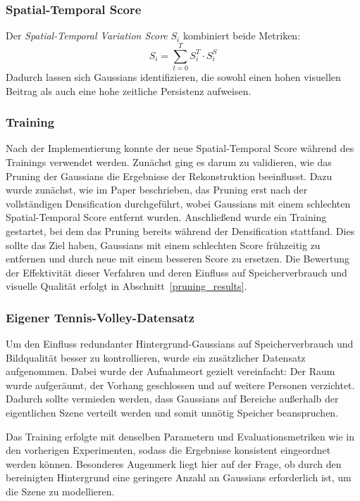 \subsubsection{Spatial-Temporal Score}  

Der \emph{Spatial-Temporal Variation Score} $S_i$ kombiniert beide Metriken:
\[
S_i = \sum_{t=0}^{T} S_i^T \cdot S_i^S
\]
Dadurch lassen sich Gaussians identifizieren, die sowohl einen hohen visuellen Beitrag als auch eine hohe zeitliche Persistenz aufweisen.

\subsubsection{Training}
Nach der Implementierung konnte der neue Spatial-Temporal Score während des Trainings verwendet werden. 
Zunächst ging es darum zu validieren, wie das Pruning der Gaussians die Ergebnisse der Rekonstruktion beeinflusst.
Dazu wurde zunächst, wie im Paper beschrieben, das Pruning erst nach der vollständigen Densification durchgeführt, wobei Gaussians mit einem schlechten Spatial-Temporal Score entfernt wurden.
Anschließend wurde ein Training gestartet, bei dem das Pruning bereits während der Densification stattfand.
Dies sollte das Ziel haben, Gaussians mit einem schlechten Score frühzeitig zu entfernen und durch neue mit einem besseren Score zu ersetzen.
Die Bewertung der Effektivität dieser Verfahren und deren Einfluss auf Speicherverbrauch und visuelle Qualität erfolgt in Abschnitt~\ref{pruning_results}.


\subsubsection{Eigener Tennis-Volley-Datensatz}

Um den Einfluss redundanter Hintergrund-Gaussians auf Speicherverbrauch und Bildqualität besser zu kontrollieren, wurde ein zusätzlicher Datensatz aufgenommen. 
Dabei wurde der Aufnahmeort gezielt vereinfacht: Der Raum wurde aufgeräumt, der Vorhang geschlossen und auf weitere Personen verzichtet. 
Dadurch sollte vermieden werden, dass Gaussians auf Bereiche außerhalb der eigentlichen Szene verteilt werden und somit unnötig Speicher beanspruchen.

Das Training erfolgte mit denselben Parametern und Evaluationsmetriken wie in den vorherigen Experimenten, sodass die Ergebnisse konsistent eingeordnet werden können. 
Besonderes Augenmerk liegt hier auf der Frage, ob durch den bereinigten Hintergrund eine geringere Anzahl an Gaussians erforderlich ist, um die Szene zu modellieren.






